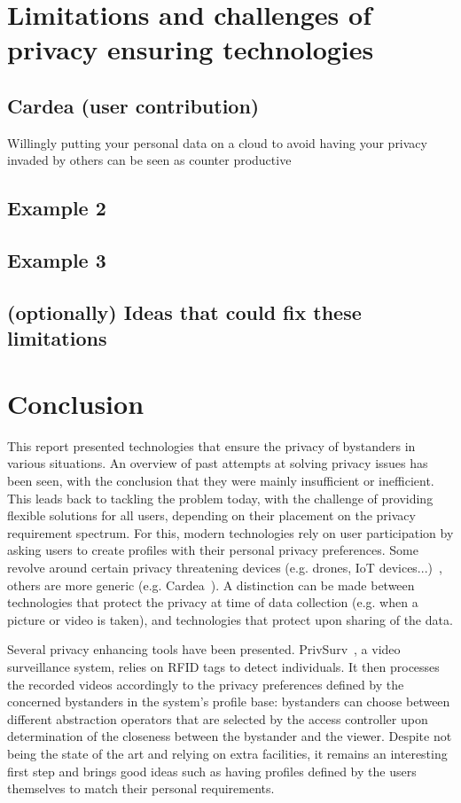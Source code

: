 \documentclass[conference]{IEEEtran}
\begin{document}
\section{Limitations and challenges of privacy ensuring technologies}\label{Limitations}

\subsection{Cardea (user contribution)}
Willingly putting your personal data on a cloud to avoid having your privacy invaded by others can be seen as counter productive

\subsection{Example 2}

\subsection{Example 3}

\subsection{(optionally) Ideas that could fix these limitations}

\section{Conclusion}\label{Conclusion}
This report presented technologies that ensure the privacy of bystanders in various situations. An overview of past attempts at solving privacy issues has been seen, with the conclusion that they were mainly insufficient or inefficient. This leads back to tackling the problem today, with the challenge of providing flexible solutions for all users, depending on their placement on the privacy requirement spectrum. For this, modern technologies rely on user participation by asking users to create profiles with their personal privacy preferences. Some revolve around certain privacy threatening devices (e.g. drones, \ac{IoT} devices...)~\cite{yao2017privacy, bernd2020bystanders}, others are more generic (e.g. Cardea~\cite{shu2016cardea}). A distinction can be made between technologies that protect the privacy at time of data collection (e.g. when a picture or video is taken), and technologies that protect upon sharing of the data.

Several privacy enhancing tools have been presented. PrivSurv~\cite{chinomi2008PriSurv}, a video surveillance system, relies on  \ac{RFID} tags to detect individuals. It then processes the recorded videos accordingly to the privacy preferences defined by the concerned bystanders in the system's profile base: bystanders can choose between different abstraction operators that are selected by the access controller upon determination of the closeness between the bystander and the viewer. Despite not being the state of the art and relying on extra facilities, it remains an interesting first step and brings good ideas such as having profiles defined by the users themselves to match their personal requirements. 
\end{document}
